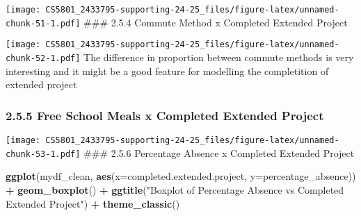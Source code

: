 \documentclass[
]{article}
\newenvironment{Shaded}{\begin{snugshade}}{\end{snugshade}}
\newcommand{\AttributeTok}[1]{\textcolor[rgb]{0.13,0.29,0.53}{#1}}
\newcommand{\FunctionTok}[1]{\textcolor[rgb]{0.13,0.29,0.53}{\textbf{#1}}}
\newcommand{\NormalTok}[1]{#1}
\newcommand{\SpecialCharTok}[1]{\textcolor[rgb]{0.81,0.36,0.00}{\textbf{#1}}}
\newcommand{\StringTok}[1]{\textcolor[rgb]{0.31,0.60,0.02}{#1}}
\begin{document}
\texttt{[image: CS5801\_2433795-supporting-24-25\_files/figure-latex/unnamed-chunk-51-1.pdf]}
\#\#\# 2.5.4 Commute Method x Completed Extended Project

\begin{Shaded}
\end{Shaded}

\texttt{[image: CS5801\_2433795-supporting-24-25\_files/figure-latex/unnamed-chunk-52-1.pdf]}
The difference in proportion between commute methods is very interesting
and it might be a good feature for modelling the completition of
extended project

\subsubsection{2.5.5 Free School Meals x Completed Extended
Project}\label{free-school-meals-x-completed-extended-project}

\begin{Shaded}
\end{Shaded}

\texttt{[image: CS5801\_2433795-supporting-24-25\_files/figure-latex/unnamed-chunk-53-1.pdf]}
\#\#\# 2.5.6 Percentage Absence x Completed Extended Project

\begin{Shaded}
\begin{Highlighting}[]
\FunctionTok{ggplot}\NormalTok{(mydf\_clean, }\FunctionTok{aes}\NormalTok{(}\AttributeTok{x=}\NormalTok{completed.extended.project, }\AttributeTok{y=}\NormalTok{percentage\_absence)) }\SpecialCharTok{+} \FunctionTok{geom\_boxplot}\NormalTok{() }\SpecialCharTok{+} \FunctionTok{ggtitle}\NormalTok{(}\StringTok{"Boxplot of Percentage Absence vs Completed Extended Project"}\NormalTok{) }\SpecialCharTok{+} \FunctionTok{theme\_classic}\NormalTok{()}
\end{Highlighting}
\end{Shaded}
\end{document}
